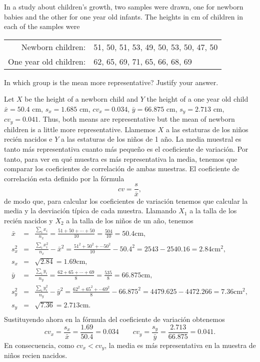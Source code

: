 {In a study about children's growth, two samples were drawn, one for newborn babies and the other for one year old infants.
The heights in cm of children in each of the samples were
\begin{center}
\begin{tabular}{rl}
Newborn children: & 51, 50, 51, 53, 49, 50, 53, 50, 47, 50\\
One year old children: & 62, 65, 69, 71, 65, 66, 68, 69
\end{tabular}
\end{center}

In which group is the mean more representative? Justify your answer.
}
{Let $X$ be the height of a newborn child and $Y$ the height of a one year old child
$\bar x = 50.4$ cm, $s_x = 1.685$ cm, $cv_x=0.034$, $\bar y=66.875$ cm, $s_y=2.713$ cm, $cv_y=0.041$.
Thus, both means are representative but the mean of newborn children is a little more representative.
}
{Llamemos $X$ a las estaturas de los niños recién nacidos e $Y$ a las estaturas de los niños de 1 año.
La media muestral es tanto más representativa cuanto más pequeño es el coeficiente de variación.
Por tanto, para ver en qué muestra es más representativa la media, tenemos que comparar los coeficientes de correlación de ambas muestras.
El coeficiente de correlación esta definido por la fórmula
\[
cv=\frac{s}{\bar{x}},
\]
de modo que, para calcular los coeficientes de variación tenemos que calcular la media y la desviación típica de cada muestra.
Llamando $X_{1}$ a la talla de los recién nacidos y $X_{2}$ a la talla de los niños de un año, tenemos
\begin{eqnarray*}
\bar{x} & = & \frac{\sum_{i}^{}x_{i}}{n_{x}} =
\frac{51+50+\cdots +50}{10} = \frac{504}{10} =50.4 \mbox{cm}, \\
s_{x}^2 & = & \frac{\sum_{i}^{}x_{i}^2}{n_{x}}-\bar{x}^2 =
\frac{51^2+50^2+\cdots 50^2}{10}-50.4^2 = 2543-2540.16 = 2.84 \mbox{cm}^2,  \\
s_{x} & = & \sqrt{2.84} = 1.69 \mbox{cm},  \\
\bar{y} & = & \frac{\sum_{i}^{}y_{i}}{n_{y}} =
\frac{62+65+\cdots +69}{8} = \frac{535}{8} = 66.875 \mbox{cm},  \\
s_{y}^2 & = & \frac{\sum_{i}^{}y_{i}^2}{n_{y}}-\bar{y}^2 =
\frac{62^2+65^2+\cdots 69^2}{8}-66.875^2 = 4479.625-4472.266 = 7.36 \mbox{cm}^2,  \\
s_{y} & = & \sqrt{7.36} = 2.713 \mbox{cm}.  \\
\end{eqnarray*}
Sustituyendo ahora en la fórmula del coeficiente de variación obtenemos
\[
cv_{x}=\frac{s_{x}}{\bar{x}} = \frac{1.69}{50.4} = 0.034 \qquad
cv_{y}=\frac{s_{y}}{\bar{y}} = \frac{2.713}{66.875} = 0.041.
\]
En consecuencia, como $cv_{x}<cv_{y}$, la media es más representativa en la muestra de niños recien nacidos.
}


